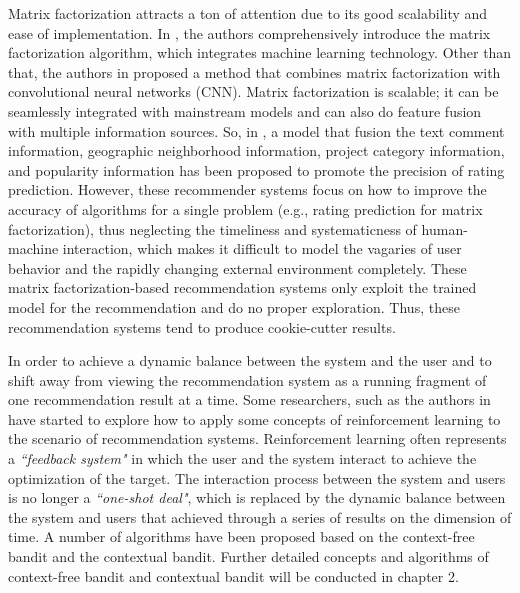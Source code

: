 Matrix factorization attracts a ton of attention due to its good scalability and ease of implementation. In \cite{mf1}, the authors comprehensively introduce the matrix factorization algorithm, which integrates machine learning technology. Other than that, the authors in \cite{convMF} proposed a method that combines matrix factorization with convolutional neural networks (CNN). Matrix factorization is scalable; it can be seamlessly integrated with mainstream models and can also do feature fusion with multiple information sources. So, in \cite{mf2}, a model that fusion the text comment information, geographic neighborhood information, project category information, and popularity information has been proposed to promote the precision of rating prediction. However, these recommender systems focus on how to improve the accuracy of algorithms for a single problem (e.g., rating prediction for matrix factorization), thus neglecting the timeliness and systematicness of human-machine interaction, which makes it difficult to model the vagaries of user behavior and the rapidly changing external environment completely. These matrix factorization-based recommendation systems only exploit the trained model for the recommendation and do no proper exploration. Thus, these recommendation systems tend to produce cookie-cutter results.

In order to achieve a dynamic balance between the system and the user and to shift away from viewing the recommendation system as a running fragment of one recommendation result at a time. Some researchers, such as the authors in \cite{context} have started to explore how to apply some concepts of reinforcement learning to the scenario of recommendation systems. Reinforcement learning often represents a \textit{``feedback system"} in which the user and the system interact to achieve the optimization of the target. The interaction process between the system and users is no longer a \textit{``one-shot deal"}, which is replaced by the dynamic balance between the system and users that achieved through a series of results on the dimension of time.  A number of algorithms have been proposed based on the context-free bandit and the contextual bandit. Further detailed concepts and algorithms of context-free bandit and contextual bandit will be conducted in chapter 2.

